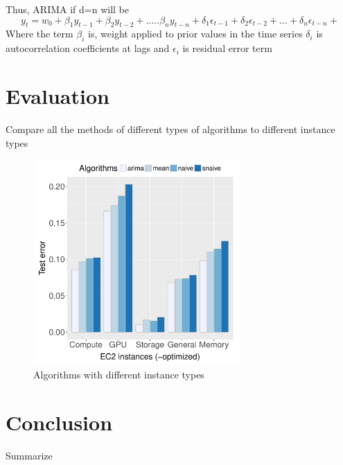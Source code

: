 \documentclass[graybox]{svmult}
\begin{document}
Thus, ARIMA if d=n will be 
\begin{equation}
 y_t = w_0 +\beta_1 y_{t-1}+ \beta_2 y_{t-2}+.....\beta_n y_{t-n} +  \delta_1 \epsilon_{t-1}+  \delta_2 \epsilon_{t-2}+...+ \delta_n \epsilon_{t-n}+
\label{Eq-ARIMA}
\end{equation}
Where the term \(\beta_i \) is, weight applied to prior values in the time series \(\delta_i \) is autocorrelation coefficients at lags and \(\epsilon_i \) is residual error term 

\section{Evaluation}
Compare all the methods of different types of algorithms to different instance types
\begin{figure}
\centering\includegraphics[width=0.7\textwidth]{figures/algorithm-compare-different-instance-type.pdf}\caption{Algorithms with different instance types\label{fig:algo-diff-inst}}
\end{figure}

\section{Conclusion}
Summarize



\end{document}
